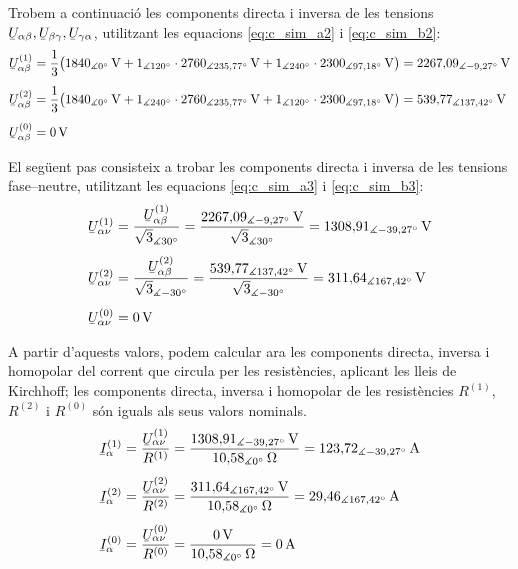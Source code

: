 \begin{exemple}
Trobem a continuaci\'{o} les components directa i inversa de les
tensions $\cmplx{U}_{\alpha\beta}, \cmplx{U}_{\beta\gamma},
\cmplx{U}_{\gamma\alpha}$, utilitzant les equacions
\eqref{eq:c_sim_a2} i \eqref{eq:c_sim_b2}:
\begin{align*}
\cmplx{U}_{\alpha\beta}\ap{(1)} &= \frac{1}{3} \big(
1840_{\measuredangle 0\degree}\unit{V} + 1_{\measuredangle
120\degree} \cdot 2760_{\measuredangle 235{,}77\degree}\unit{V} +
1_{\measuredangle 240\degree} \cdot 2300_{\measuredangle
97{,}18\degree}\unit{V} \big) = 2267{,}09_{\measuredangle -9{,}27\degree}\unit{V} \\[1ex]
\cmplx{U}_{\alpha\beta}\ap{(2)} &= \frac{1}{3} \big(
1840_{\measuredangle 0\degree}\unit{V} + 1_{\measuredangle
240\degree} \cdot 2760_{\measuredangle 235{,}77\degree}\unit{V} +
1_{\measuredangle 120\degree} \cdot 2300_{\measuredangle
97{,}18\degree}\unit{V} \big) = 539{,}77_{\measuredangle
137{,}42\degree}\unit{V} \\[1ex]
\cmplx{U}_{\alpha\beta}\ap{(0)} &= 0\unit{V}
\end{align*}

El seg\"{u}ent pas consisteix a trobar les components directa i inversa
de les tensions fase--neutre, utilitzant les equacions
\eqref{eq:c_sim_a3} i \eqref{eq:c_sim_b3}:
\begin{align*}
\cmplx{U}_{\alpha\nu}\ap{(1)} &=
\frac{\cmplx{U}_{\alpha\beta}\ap{(1)}}{\sqrt{3}_{\measuredangle
30\degree}} = \frac{2267{,}09_{\measuredangle
-9{,}27\degree}\unit{V}}{\sqrt{3}_{\measuredangle
30\degree}} = 1308{,}91_{\measuredangle -39{,}27\degree}\unit{V} \\[1ex]
\cmplx{U}_{\alpha\nu}\ap{(2)} &=
\frac{\cmplx{U}_{\alpha\beta}\ap{(2)}}{\sqrt{3}_{\measuredangle
-30\degree}} = \frac{539{,}77_{\measuredangle
137{,}42\degree}\unit{V}}{\sqrt{3}_{\measuredangle -30\degree}} =
311{,}64_{\measuredangle 167{,}42\degree}\unit{V} \\[1ex]
\cmplx{U}_{\alpha\nu}\ap{(0)} &= 0\unit{V}
\end{align*}

A partir d'aquests valors, podem calcular ara les components
directa, inversa i homopolar del corrent que circula per les
resist\`{e}ncies, aplicant les lleis de Kirchhoff; les components
directa, inversa i homopolar de les resist\`{e}ncies $R^{(1)}$,
$R^{(2)}$ i $R^{(0)}$ s\'{o}n iguals als seus valors nominals.
\begin{align*}
\cmplx{I}_\alpha\ap{(1)} &=
\frac{\cmplx{U}_{\alpha\nu}\ap{(1)}}{R^{(1)}} =
\frac{1308{,}91_{\measuredangle
-39{,}27\degree}\unit{V}}{10{,}58_{\measuredangle 0 \degree}
\unit{\ohm}} =
123{,}72_{\measuredangle -39{,}27\degree}\unit{A} \\[1ex]
\cmplx{I}_\alpha\ap{(2)} &=
\frac{\cmplx{U}_{\alpha\nu}\ap{(2)}}{R^{(2)}} =
\frac{311{,}64_{\measuredangle
167{,}42\degree}\unit{V}}{10{,}58_{\measuredangle 0 \degree}
\unit{\ohm}} = 29{,}46_{\measuredangle 167{,}42\degree}\unit{A} \\[1ex]
\cmplx{I}_\alpha\ap{(0)} &=
\frac{\cmplx{U}_{\alpha\nu}\ap{(0)}}{R^{(0)}} =
\frac{0\unit{V}}{10{,}58_{\measuredangle 0 \degree}\unit{\ohm}} =
0\unit{A}
\end{align*}


\end{exemple}

